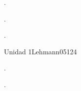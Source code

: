 \begin{syllabus}


\begin{justification}
.
\end{justification}

\begin{goals}
\item .
\item .
\end{goals}

\begin{outcomes}
    \item {} %
    \item {} %
    \item {} %
    \item {} %
    \item {} %
\end{outcomes}

\begin{competences}
    \item {}
    \item {}
    \item {}
    \item {}
\end{competences}

\begin{unit}{Unidad 1}{}{Lehmann05}{12}{4}
   \begin{topics}
      \item .
   \end{topics}
   \begin{learningoutcomes}
      \item .
   \end{learningoutcomes}
\end{unit}

\begin{coursebibliography}
\end{coursebibliography}

\end{syllabus}
